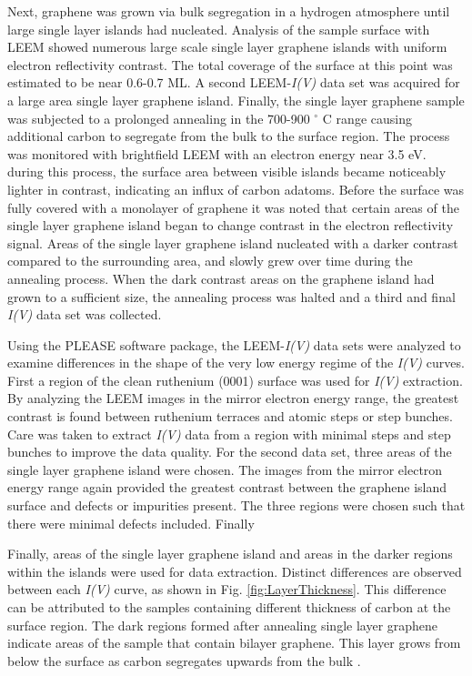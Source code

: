 Next, graphene was grown via bulk segregation in a hydrogen atmosphere until large single layer islands had nucleated. Analysis of the sample surface with LEEM showed numerous large scale single layer graphene islands with uniform electron reflectivity contrast. The total coverage of the surface at this point was estimated to be near 0.6-0.7 ML. A second LEEM-\textit{I(V)} data set was acquired for a large area single layer graphene island. Finally, the single layer graphene sample was subjected to a prolonged annealing in the 700-900 $^\circ$ C range causing additional carbon to segregate from the bulk to the surface region. The process was monitored with brightfield LEEM with an electron energy near 3.5 eV. during this process, the surface area between visible islands became noticeably lighter in contrast, indicating an influx of carbon adatoms. Before the surface was fully covered with a monolayer of graphene it was noted that certain areas of the single layer graphene island began to change contrast in the electron reflectivity signal. Areas of the single layer graphene island nucleated with a darker contrast compared to the surrounding area, and slowly grew over time during the annealing process. When the dark contrast areas on the graphene island had grown to a sufficient size, the annealing process was halted and a third and final \textit{I(V)} data set was collected.

Using the PLEASE software package, the LEEM-\textit{I(V)} data sets were analyzed to examine differences in the shape of the very low energy regime of the \textit{I(V)} curves. First a region of the clean ruthenium (0001) surface was used for \textit{I(V)} extraction. By analyzing the LEEM images in the mirror electron energy range, the greatest contrast is found between ruthenium terraces and atomic steps or step bunches. Care was taken to extract \textit{I(V)} data from a region with minimal steps and step bunches to improve the data quality. For the second data set, three areas of the single layer graphene island were chosen. The images from the mirror electron energy range again provided the greatest contrast between the graphene island surface and defects or impurities present. The three regions were chosen such that there were minimal defects included. Finally


Finally, areas of the single layer graphene island and areas in the darker regions within the islands were used for data extraction. Distinct differences are observed between each \textit{I(V)} curve, as shown in Fig. \ref{fig:LayerThickness}. This difference can be attributed to the samples containing different thickness of carbon at the surface region. The dark regions formed after annealing single layer graphene indicate areas of the sample that contain bilayer graphene. This layer grows from below the surface as carbon segregates upwards from the bulk \cite{Graphene-on-metals}.

